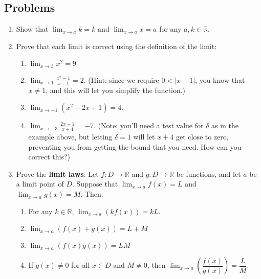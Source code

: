\documentclass[letterpaper,12pt]{article}
\newcommand{\R}{\mathbb{R}}
\newcommand{\abs}[1]{\lvert #1\rvert}
\begin{document}
\subsection*{Problems}
\begin{enumerate}
 \item Show that $\displaystyle\lim_{x\to a}k = k$ and $\displaystyle\lim_{x\to a}x = a$ for any $a,k\in\R$.

 \item Prove that each limit is correct using the definition of the limit:
\begin{enumerate}
 \item $\displaystyle\lim_{x\to 3}x^2=9$
 \item $\displaystyle\lim_{x\to 1}\frac{x^2-1}{x-1} = 2$. (Hint: since we require $0<\abs{x-1}$, you know that $x\neq 1$, and this will let you simplify the function.)
 \item $\displaystyle\lim_{x\to -1}(x^2-2x+1) = 4$.
 \item $\displaystyle\lim_{x\to -3}\frac{2x-1}{x+4} = -7$. (Note: you'll need a test value for $\delta$ as in the example above, but letting $\delta=1$ will let $x+4$ get close to zero, preventing you from getting the bound that you need. How can you correct this?)
\end{enumerate}
\item Prove the {\bf limit laws}: Let $f:D\to \R$ and $g:D\to \R$ be functions, and let $a$ be a limit point of $D$. Suppose that $\lim_{x\to a}f(x)=L$ and $\lim_{x\to a}g(x) = M$. Then:
\begin{enumerate}
 \item For any $k\in\R$, $\displaystyle\lim_{x\to a}(kf(x)) = kL$.
 \item $\displaystyle\lim_{x\to a}(f(x)+g(x)) = L+M$
 \item $\displaystyle\lim_{x\to a}(f(x)g(x)) = LM$
 \item If $g(x)\neq 0$ for all $x\in D$ and $M\neq 0$, then $\displaystyle\lim_{x\to a}\left(\dfrac{f(x)}{g(x)}\right) = \dfrac{L}{M}$.
\end{enumerate}

\end{enumerate}
\end{document}
